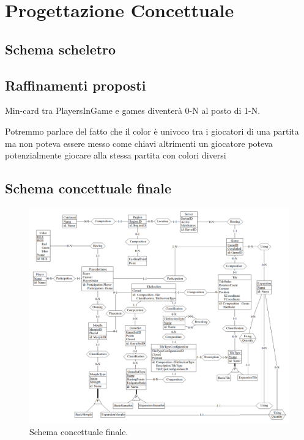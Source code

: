 \section{Progettazione Concettuale}
\subsection{Schema scheletro}

\subsection{Raffinamenti proposti}
Min-card tra PlayersInGame e games diventerà 0-N al posto di 1-N.
\medskip

Potremmo parlare del fatto che il color è univoco tra i giocatori di una partita ma non poteva essere messo come chiavi altrimenti un giocatore poteva potenzialmente giocare alla stessa partita con colori diversi

\subsection{Schema concettuale finale}
\begin{figure}[hb]
    \centering\includegraphics[scale=0.24]{images/Progettazione/Concettuale/modello.png}
    \caption{Schema concettuale finale.}
\end{figure}